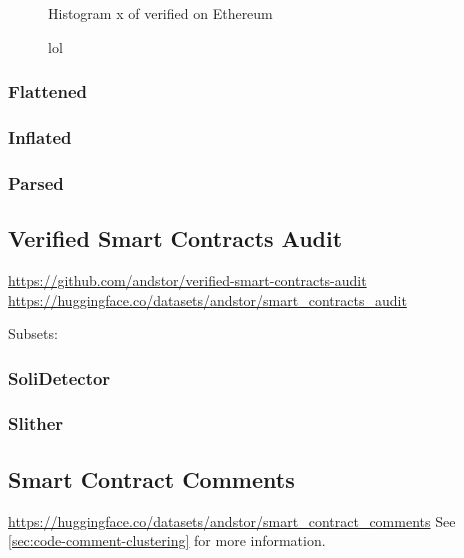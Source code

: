 \begin{figure}[ht]
    \centering
    
    \caption{Histogram \small x of verified  on Ethereum}
\end{figure}


\begin{figure}[ht]
    \centering
    
    \caption{lol}
\end{figure}




\subsubsection{Flattened}
\label{sec:verified-smart-contracts-flattened}

\subsubsection{Inflated}
\label{sec:verified-smart-contracts-inflated}

\subsubsection{Parsed}
\label{sec:verified-smart-contracts-parsed}



\subsection{Verified Smart Contracts Audit}
\label{sec:verified-smart-contracts-audit}
\url{https://github.com/andstor/verified-smart-contracts-audit}
\url{https://huggingface.co/datasets/andstor/smart_contracts_audit}

Subsets:
\subsubsection{SoliDetector}
\label{sec:verified-smart-contracts-audit-solidector}

\subsubsection{Slither}
\label{sec:verified-smart-contracts-audit-slither}



\subsection{Smart Contract Comments}
\label{sec:verified-smart-contracts-comments}

\url{https://huggingface.co/datasets/andstor/smart_contract_comments}
See \cref{sec:code-comment-clustering} for more information.